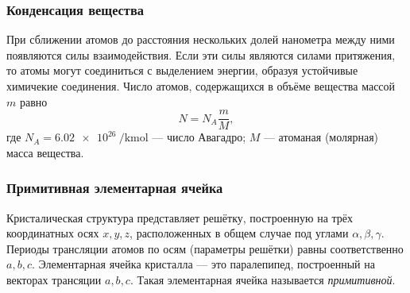 \subsubsection{Конденсация вещества}

При сближении атомов до расстояния нескольких долей нанометра между ними
появляются силы взаимодействия. Если эти силы являются силами притяжения, то
атомы могут соединиться с выделением энергии, образуя устойчивые химичекие
соединения. Число атомов, содержащихся в объёме вещества массой $m$ равно
\[
	N = N_A \frac{m}{M}
	,\]
где $N_A = \qty{6.02e26}{\per\kilo\mol}$ --- число Авагадро; $M$ --- атоманая
(молярная) масса вещества.

\subsubsection{Примитивная элементарная ячейка}

Кристалическая структура представляет решётку, построенную на трёх координатных
осях $x, y, z$, расположенных в общем случае под углами $\alpha, \beta, \gamma$.
Периоды трансляции атомов по осям (параметры решётки) равны соответственно $a,
	b, c$. Элементарная ячейка кристалла --- это паралепипед, построенный на
векторах трансяции $a, b, c$. Такая элементарная ячейка называется
\emph{примитивной}.
